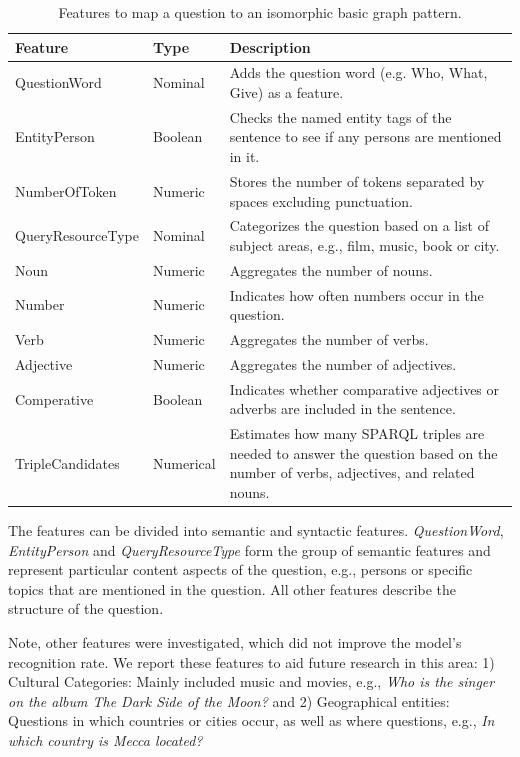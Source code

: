 \documentclass{IOS-Book-Article}
\begin{document}
\begin{table}[htb!]
\caption{Features to map a question to an isomorphic basic graph pattern.}\label{table-question-features}
\begin{tabularx}{\textwidth}{llX}
\toprule
  \textbf{Feature} & \textbf{Type} & \textbf{Description} \\
  \midrule
  QuestionWord & Nominal & Adds the question word (e.g. Who, What, Give) as a feature. \\
  EntityPerson & Boolean & Checks the named entity tags of the sentence to see if any persons are mentioned in it.  \\
  NumberOfToken & Numeric & Stores the number of tokens separated by spaces excluding punctuation. \\
  QueryResourceType & Nominal & Categorizes the question based on a list of subject areas, e.g., film, music, book or city.\\
  Noun & Numeric & Aggregates the number of nouns. \\
  Number & Numeric & Indicates how often numbers occur in the question.\\
  Verb & Numeric & Aggregates the number of verbs. \\
  Adjective & Numeric & Aggregates the number of adjectives. \\
  Comperative & Boolean & Indicates whether comparative adjectives or adverbs are included in the sentence.\\
  TripleCandidates & Numerical & Estimates how many SPARQL triples are needed to answer the question based on the number of verbs, adjectives, and related nouns.\\
  \bottomrule
\end{tabularx}
\end{table}

The features can be divided into semantic and syntactic features. \textit{QuestionWord}, \textit{EntityPerson} and \textit{QueryResourceType} form the group of semantic features and represent particular content aspects of the question, e.g., persons or specific topics that are mentioned in the question. All other features describe the structure of the question.

Note, other features were investigated, which did not improve the model's recognition rate. 
We report these features to aid future research in this area: 1) {Cultural Categories}: Mainly included music and movies, e.g., \textit{Who is the singer on the album The Dark Side of the Moon?} and 2) {Geographical entities}: Questions in which countries or cities occur, as well as where questions, e.g., \textit{In which country is Mecca located?}
\end{document}

